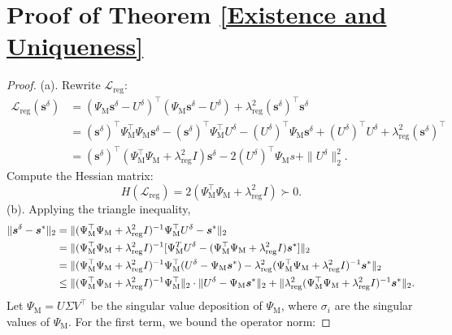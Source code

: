 \documentclass{article}
\theoremstyle{plain}
\theoremstyle{definition}
\begin{document}
{\section{Proof of Theorem \ref{Existence and Uniqueness}}
\begin{proof}
(a). Rewrite $\mathcal{L}_{\text{reg}}$:
\begin{align*}\mathcal{L}_{\text{reg}}(\boldsymbol{s}^{\delta})&=(\Psi_\mathrm{M}\boldsymbol{s}^{\delta}-U^\delta)^\top(\Psi_\mathrm{M}\boldsymbol{s}^{\delta}-U^\delta)+\lambda_{\text{reg}}^2 (\boldsymbol{s}^{\delta})^\top \boldsymbol{s}^{\delta}\\&=(\boldsymbol{s}^{\delta})^\top\Psi_\mathrm{M}^\top\Psi_\mathrm{M}\boldsymbol{s}^{\delta}-(\boldsymbol{s}^{\delta})^\top\Psi_\mathrm{M}^\top U^\delta-(U^\delta)^\top\Psi_\mathrm{M}\boldsymbol{s}^{\delta}+(U^\delta)^\top U^\delta+\lambda_{\text{reg}}^2(\boldsymbol{s}^{\delta})^\top \\&=(\boldsymbol{s}^{\delta})^\top(\Psi_\mathrm{M}^\top\Psi_\mathrm{M}+\lambda_{\text{reg}}^2I)\boldsymbol{s}^{\delta}-2(U^\delta)^\top\Psi_\mathrm{M}s+\|U^\delta\|_2^2.\end{align*}
Compute the Hessian matrix:
$$
H(\mathcal{L}_{\text{reg}})=2(\Psi_\mathrm{M}^\top\Psi_\mathrm{M}+\lambda_{\text{reg}}^2I) \succ 0.
$$
(b). Applying the triangle inequality,  
    \begin{align}
        \label{eq:err_decomp}
        \|\boldsymbol{s}^{\delta}-\boldsymbol{s}^{*}\|_2&=\|(\Psi_\text{M}^\top\Psi_\text{M}+\lambda_{\text{reg}}^2 I)^{-1}\Psi_\text{M}^\top U^{\delta}-\boldsymbol{s}^{*}\|_2 \notag\\
        &=\|(\Psi_\text{M}^\top\Psi_\text{M}+\lambda_{\text{reg}}^2 I)^{-1}[\Psi_\text{M}^{T}U^{\delta}-(\Psi_\text{M}^\top\Psi_\text{M}+\lambda_{\text{reg}}^2 I)\boldsymbol{s}^{*}]\|_2 \notag\\
        &=\|(\Psi_\text{M}^\top\Psi_\text{M}+\lambda_{\text{reg}}^2 I)^{-1}\Psi_\text{M}^\top(U^{\delta}-\Psi_\text{M}\boldsymbol{s}^{*})-\lambda_{\text{reg}}^2 (\Psi_\text{M}^\top\Psi_\text{M}+\lambda_{\text{reg}}^2 I)^{-1} \boldsymbol{s}^{*}\|_2 \notag\\
        &\leq \|(\Psi_\text{M}^\top\Psi_\text{M}+\lambda_{\text{reg}}^2 I)^{-1}\Psi_\text{M}^\top\|_2\cdot \|U^{\delta}-\Psi_\text{M}\boldsymbol{s}^{*}\|_2+\|\lambda_{\text{reg}}^2 (\Psi_\text{M}^\top\Psi_\text{M}+\lambda_{\text{reg}}^2 I)^{-1} \boldsymbol{s}^{*}\|_2.
    \end{align}
    Let $\Psi_\text{M}=U\Sigma V^\top$ be the singular value deposition of $\Psi_\text{M}$,  where $\sigma_i$ are the singular values of $\Psi_\text{M}$. For the first term,  we bound the operator norm: 

\end{proof}}
\end{document}
